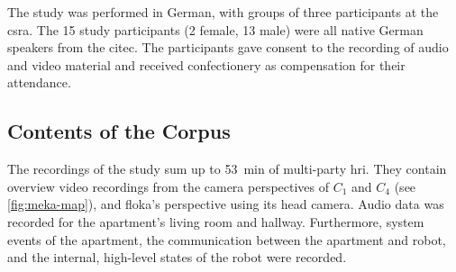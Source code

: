 The study was performed in German, with groups of three participants at the \gls{csra}.
The 15 study participants (2 female, 13 male) were all native German \glspl{speaker} from the \gls{citec}.
The participants gave consent to the recording of audio and video material and received confectionery as compensation for their attendance.

\subsection{Contents of the Corpus}\label{sec:meka.corpus}

The recordings of the study sum up to \SI{53}{min} of multi-party \gls{hri}.
They contain overview video recordings from the camera perspectives of \(C_1\) and \(C_4\) (see \cref{fig:meka-map}), and \gls{floka}'s perspective using its head camera.
Audio data was recorded for the \gls{apartment}'s living room and hallway.
Furthermore, system events of the \gls{apartment}, the communication between the \gls{apartment} and \gls{robot}, and the internal, high-level states of the \gls{robot} were recorded.

